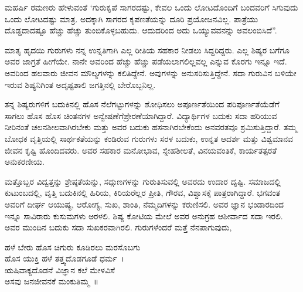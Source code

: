 {ಮಹರ್ಷಿ ರಮಣರು ಹೇಳುವಂತೆ ‘ಗುರುಕೃಪೆ ಸಾಗರದಷ್ಟು, ಕೇವಲ ಒಂದು ಲೋಟದೊಂದಿಗೆ ಬಂದವರಿಗೆ ಸಿಗುವುದು ಒಂದು ಲೋಟದಷ್ಟು ಮಾತ್ರ. ಅದಕ್ಕಾಗಿ ಸಾಗರದ ಕೃಪಣತೆಯನ್ನು ದೂರಿ ಪ್ರಯೋಜನವಿಲ್ಲ. ಪಾತ್ರೆಯು ದೊಡ್ಡದಾದಷ್ಟೂ ಹೆಚ್ಚು ಹೆಚ್ಚು ತುಂಬಿಕೊಳ್ಳಬಹುದು. ಆದುದರಿಂದ ಅದು ಒಯ್ಯುವವನನ್ನು ಅವಲಂಬಿ\-ಸಿದೆ”.

ಮಾತೃ ಹೃದಯಿ ಗುರುಗಳು ನನ್ನ ಉನ್ನತಿಗಾಗಿ ಎಲ್ಲ ರೀತಿಯ ಸಹಕಾರ ನೀಡಲು ಸಿದ್ದರಿದ್ದರು. ಎಲ್ಲ ಶಿಷ್ಯರ ಬಗೆಗೂ ಅವರ ಜಾಗ್ರತೆ ಹೀಗೆಯೇ. ನಾನೇ ಅವರಿಂದ ಹೆಚ್ಚು ಹೆಚ್ಚು ಪಡೆಯಲಾಗಲಿಲ್ಲವಲ್ಲ ಎನ್ನುವ ಕೊರಗು ಇನ್ನೂ ಇದೆ. ಅವರಿಂದ ಹಲವಾರು ಜೀವನ ಮೌಲ್ಯಗಳನ್ನು ಕಲಿತಿದ್ದೇನೆ. ಅವುಗಳನ್ನು ಅನುಸರಿಸುತ್ತಿದ್ದೇನೆ. ಸದಾ ಗುರುವಿನ ಬಳಿಯೇ ಇರುವ ಶಿಷ್ಯನಿಗಿಂತ ಅದೃಷ್ಟಶಾಲಿ ಜಗತ್ತಿನಲ್ಲಿ ಬೇರೊಬ್ಬನಿಲ್ಲ.

ತನ್ನ ಶಿಷ್ಯರುಗಳಿಗೆ ಬದುಕಿನಲ್ಲಿ ಹೊಸ ನೆಲೆಗಟ್ಟುಗಳನ್ನು ಶೋಧಿಸಲು ಅಪೂರ್ಣತೆ\-ಯಿಂದ ಪರಿಪೂರ್ಣತೆಯೆಡೆಗೆ ಸಾಗಲು ಹೊಸ ಹೊಸ ಚಿಂತನಗಳ ಅನ್ವೇಷಣೆಗೆ\break ಪ್ರೇರಣೆಯಾಗಿದ್ದಾರೆ. ವಿದ್ಯಾರ್ಥಿಗಳ ಬದುಕು ಸದಾ ಹರಿಯುವ ನೀರಿನಂತೆ ಚಲನಶೀಲ\-ವಾಗಿರಬೇಕು ಮತ್ತು ಅವರ ಬದುಕು ಹಸನಾಗಿರಬೇಕೆಂದು ಅನವರತವೂ ಶ್ರಮಿಸುತ್ತಿದ್ದಾರೆ. ತಮ್ಮ ಬೋಧಕ ವೃತ್ತಿಯಲ್ಲಿ ಸಾರ್ಥಕತೆಯನ್ನು ಕಂಡಿರುವ ಗುರುಗಳು ಸರಳ ಬದುಕು, ಉನ್ನತ ಆದರ್ಶ ಮತ್ತು ವಿಶ್ವಮಾನವ ಜೀವನ ಕೃಷ್ಟಿ ಹೊಂದಿದವರು. ಅವರ ಸಹಕಾರ ಮನೋಭಾವ, ಸ್ನೇಹಶೀಲತೆ, ವಿನಯವಂತಿಕೆ, ಕಾರ್ಯತತ್ಪರತೆ ಅನುಕರಣೀಯ.

ಮತ್ತೊಬ್ಬರ ವಿದ್ವತ್ತನ್ನು ಶ್ರೇಷ್ಠತೆಯನ್ನು, ಸದ್ಗುಣಗಳನ್ನು ಗುರುತಿಸುವಲ್ಲಿ ಅವರದು ಉದಾರ ದೃಷ್ಟಿ. ಸಮಾಜದಲ್ಲಿ ಕುಟುಂಬದಲ್ಲಿ, ವೃತ್ತಿ ಬದುಕಿನಲ್ಲಿ ಹಿರಿಯ, ಕಿರಿಯರೆಲ್ಲರ ಪ್ರೀತಿ, ಗೌರವ, ವಿಶ್ವಾಸಕ್ಕೆ ಪಾತ್ರರಾಗಿದ್ದಾರೆ. ಭಗವಂತ ಅವರಿಗೆ ದೀರ್ಘ ಆಯುಷ್ಯ, ಆರೋಗ್ಯ, ಸುಖ, ಶಾಂತಿ, ನೆಮ್ಮದಿಗಳನ್ನು ಕರುಣಿಸಲಿ. ಅವರ ಜ್ಞಾನ ಭಂಡಾರದಿಂದ ಇನ್ನೂ ಸಾವಿರಾರು ಕುಸುಮಗಳು ಅರಳಲಿ. ಶಿಷ್ಯ ಕೋಟಿಯ ಮೇಲೆ ಅವರ ಅನುಗ್ರಹ ಆಶೀರ್ವಾದ ಸದಾ ಇರಲಿ. ಅವರ ಮುಂದಿನ ಬದುಕು ಸದಾ ಸುಖ\-ಕರ\-ವಾಗಿರಲಿ. ಗುರುಗಳೆಂದರೆ ಮತ್ತೆ ನೆನಪಾಗುವುದು,
\begin{center}
ಹಳೆ ಬೇರು ಹೊಸ ಚಿಗುರು ಕೂಡಿರಲು ಮರಸೊಬಗು\\
ಹೊಸ ಯುಕ್ತಿ ಹಳೆ ತತ್ತ್ವದೊಡಗೂಡೆ ಧರ್ಮ~।\\
ಋಷಿವಾಕ್ಯದೊಡನೆ ವಿಜ್ಞಾನ ಕಲೆ ಮೇಳವಿಸೆ \\
ಅಸವು ಜನಜೀವನಕೆ   \enginline{-}   ಮಂಕುತಿಮ್ಮ~॥
\end{center}

\articleend
}
